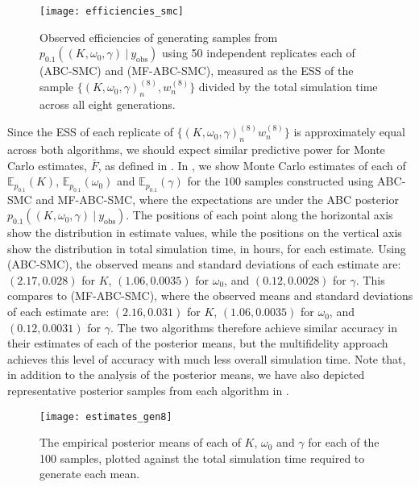 \documentclass[12pt, onecolumn]{article}
\newcommand{\obs}[1]{#1_{\mathrm{obs}}}
\begin{document}
\begin{figure}
\centering
\texttt{[image: efficiencies\_smc]}
\caption{
Observed efficiencies of generating samples from $p_{0.1}((K, \omega_0, \gamma)~|~\obs y)$ using 50 independent replicates each of  (ABC-SMC) and  (MF-ABC-SMC), measured as the ESS of the sample $\{(K, \omega_0, \gamma)_n^{(8)}, w_n^{(8)}\}$ divided by the total simulation time across all eight generations.
}
\label{fig:efficiencies_smc}
\end{figure}

Since the ESS of each replicate of $\{ (K, \omega_0, \gamma)_n^{(8)} w_n^{(8)}  \}$ is approximately equal across both algorithms, we should expect similar predictive power for Monte Carlo estimates, $\bar F$, as defined in .
In , we show Monte Carlo estimates of each of $\mathbb E_{p_{0.1}}(K)$, $\mathbb E_{p_{0.1}}(\omega_0)$ and $\mathbb E_{p_{0.1}}(\gamma)$ for the $100$ samples constructed using ABC-SMC and MF-ABC-SMC, where the expectations are under the ABC posterior $p_{0.1}((K, \omega_0, \gamma)~|~\obs y)$.
The positions of each point along the horizontal axis show the distribution in estimate values, while the positions on the vertical axis show the distribution in total simulation time, in hours, for each estimate.
Using  (ABC-SMC), the observed means and standard deviations of each estimate are: 
$(2.17, 0.028)$ for $K$, $(1.06, 0.0035)$ for $\omega_0$, and $(0.12, 0.0028)$ for $\gamma$.
This compares to  (MF-ABC-SMC), where the observed means and standard deviations of each estimate are: 
$(2.16, 0.031)$ for $K$, $(1.06, 0.0035)$ for $\omega_0$, and $(0.12, 0.0031)$ for $\gamma$.
The two algorithms therefore achieve similar accuracy in their estimates of each of the posterior means, but the multifidelity approach achieves this level of accuracy with much less overall simulation time.
Note that, in addition to the analysis of the posterior means, we have also depicted representative posterior samples from each algorithm in .

\begin{figure*}
\centering
\texttt{[image: estimates\_gen8]}
\caption{
The empirical posterior means of each of $K$, $\omega_0$ and $\gamma$ for each of the 100 samples, plotted against the total simulation time required to generate each mean.
}
\label{fig:empirical_means}
\end{figure*}
\end{document}
